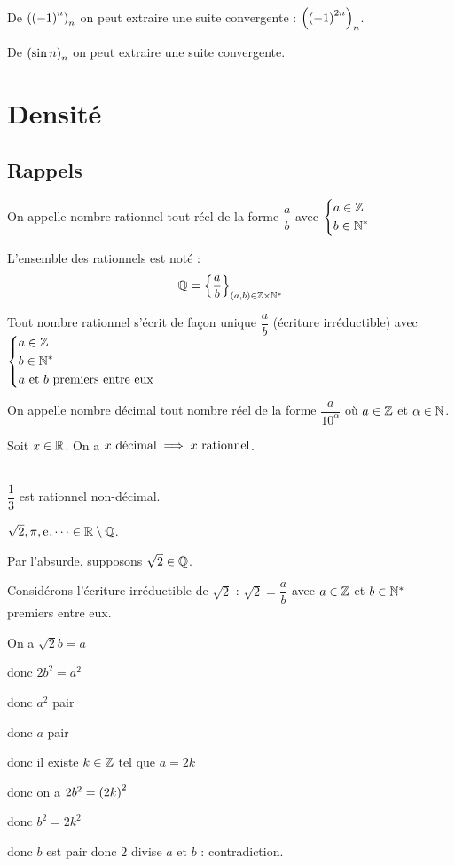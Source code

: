 \begin{ex}
De \(\left(\left(-1\right)^n\right)_n\) on peut extraire une suite convergente : \(\left(\left(-1\right)^{2n}\right)_n\).

De \(\left(\sin n\right)_n\) on peut extraire une suite convergente.
\end{ex}

\section{Densité}

\subsection{Rappels}

\begin{defi}
On appelle nombre rationnel tout réel de la forme \(\dfrac{a}{b}\) avec \(\begin{dcases}a\in\mathbb{Z} \\ b\in\mathbb{N}^*\end{dcases}\)

L'ensemble des rationnels est noté : \[\mathbb{Q}=\left\lbrace\dfrac{a}{b}\right\rbrace_{\left(a,b\right)\in\mathbb{Z}\times\mathbb{N}^*}\]

Tout nombre rationnel s'écrit de façon unique \(\dfrac{a}{b}\) (écriture irréductible) avec \(\begin{dcases}a\in\mathbb{Z} \\ b\in\mathbb{N}^* \\ a\text{ et }b\text{ premiers entre eux}\end{dcases}\)
\end{defi}

\begin{defi}
On appelle nombre décimal tout nombre réel de la forme \(\dfrac{a}{10^\alpha}\) où \(a\in\mathbb{Z}\) et \(\alpha\in\mathbb{N}\).
\end{defi}

\begin{rem}
Soit \(x\in\mathbb{R}\). On a \(x\text{ décimal}\implies x\text{ rationnel}\).
\end{rem}

\begin{ex}~\\
\(\dfrac{1}{3}\) est rationnel non-décimal.

\(\sqrt{2},\pi,\mathrm{e}^{},\dots\in\mathbb{R}\setminus\mathbb{Q}\).
\end{ex}

\begin{dem}
Par l'absurde, supposons \(\sqrt{2}\in\mathbb{Q}\).

Considérons l'écriture irréductible de \(\sqrt{2}\) : \(\sqrt{2}=\dfrac{a}{b}\) avec \(a\in\mathbb{Z}\) et \(b\in\mathbb{N}^*\) premiers entre eux.

On a \(\sqrt{2}b=a\)

donc \(2b^2=a^2\)

donc \(a^2\) pair

donc \(a\) pair

donc il existe \(k\in\mathbb{Z}\) tel que \(a=2k\)

donc on a \(2b^2=\left(2k\right)^2\)

donc \(b^2=2k^2\)

donc \(b\) est pair donc \(2\) divise \(a\) et \(b\) : contradiction.
\end{dem}

